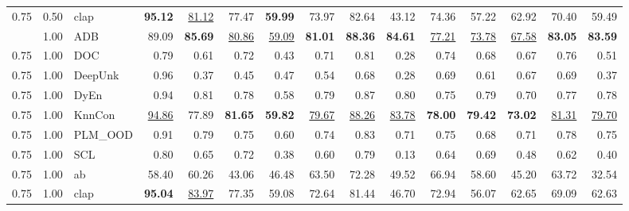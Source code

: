 \begin{table}[t]
{\begin{tabular}{lllrrrrrrrrrrrr}
0.75 & 0.50 & clap & \textbf{95.12} & \underline{81.12} & 77.47 & \textbf{59.99} & 73.97 & 82.64 & 43.12 & 74.36 & 57.22 & 62.92 & 70.40 & 59.49 \\
\addlinespace
0.75 & 1.00 & ADB & 89.09 & \textbf{85.69} & \underline{80.86} & \underline{59.09} & \textbf{81.01} & \textbf{88.36} & \textbf{84.61} & \underline{77.21} & \underline{73.78} & \underline{67.58} & \textbf{83.05} & \textbf{83.59} \\
0.75 & 1.00 & DOC & 0.79 & 0.61 & 0.72 & 0.43 & 0.71 & 0.81 & 0.28 & 0.74 & 0.68 & 0.67 & 0.76 & 0.51 \\
0.75 & 1.00 & DeepUnk & 0.96 & 0.37 & 0.45 & 0.47 & 0.54 & 0.68 & 0.28 & 0.69 & 0.61 & 0.67 & 0.69 & 0.37 \\
0.75 & 1.00 & DyEn & 0.94 & 0.81 & 0.78 & 0.58 & 0.79 & 0.87 & 0.80 & 0.75 & 0.79 & 0.70 & 0.77 & 0.78 \\
0.75 & 1.00 & KnnCon & \underline{94.86} & 77.89 & \textbf{81.65} & \textbf{59.82} & \underline{79.67} & \underline{88.26} & \underline{83.78} & \textbf{78.00} & \textbf{79.42} & \textbf{73.02} & \underline{81.31} & \underline{79.70} \\
0.75 & 1.00 & PLM_OOD & 0.91 & 0.79 & 0.75 & 0.60 & 0.74 & 0.83 & 0.71 & 0.75 & 0.68 & 0.71 & 0.78 & 0.75 \\
0.75 & 1.00 & SCL & 0.80 & 0.65 & 0.72 & 0.38 & 0.60 & 0.79 & 0.13 & 0.64 & 0.69 & 0.48 & 0.62 & 0.40 \\
0.75 & 1.00 & ab & 58.40 & 60.26 & 43.06 & 46.48 & 63.50 & 72.28 & 49.52 & 66.94 & 58.60 & 45.20 & 63.72 & 32.54 \\
0.75 & 1.00 & clap & \textbf{95.04} & \underline{83.97} & 77.35 & 59.08 & 72.64 & 81.44 & 46.70 & 72.94 & 56.07 & 62.65 & 69.09 & 62.63 \\
\bottomrule
\end{tabular}}
\end{table}